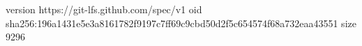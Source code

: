 version https://git-lfs.github.com/spec/v1
oid sha256:196a1431e5e3a8161782f9197c7ff69c9cbd50d2f5c654574f68a732eaa43551
size 9296
